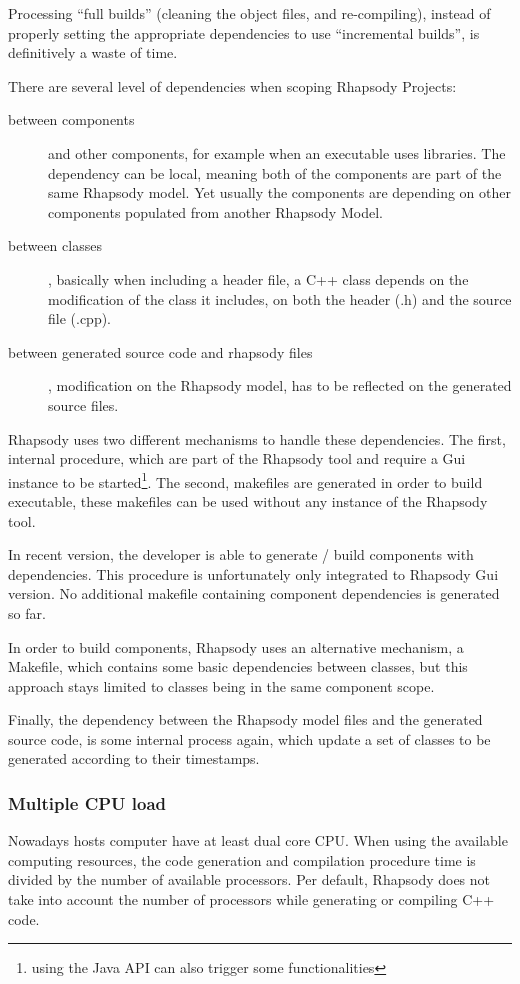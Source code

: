 \documentclass[dvips]{imsart}
\begin{document}
Processing ``full builds'' (cleaning the object files, and re-compiling), instead of properly
setting the appropriate dependencies to use ``incremental builds'', is
definitively a waste of time.

There are several level of dependencies when scoping Rhapsody Projects:
\begin{description}
  \item[between components] and other components, for example when an executable
  uses libraries. The dependency can be local, meaning both of the components
  are part of the same Rhapsody model. Yet usually the components are depending
  on other components populated from another Rhapsody Model.
  \item[between classes], basically when including a header file, a C++ class
  depends on the modification of the class it includes, on both the header (.h)
  and the source file (.cpp).
  \item[between generated source code and rhapsody files], modification on the
  Rhapsody model, has to be reflected on the generated source files.
\end{description}

Rhapsody uses two different mechanisms to handle these dependencies. The first,
internal procedure, which are part of the Rhapsody tool and require a Gui
instance to be started\footnote{using the Java API can also trigger some
functionalities}. The second, makefiles are generated in order to build
executable, these makefiles can be used without any instance of the
Rhapsody tool.

In recent version, the developer is able to generate / build
components with dependencies. This procedure is unfortunately only integrated
to Rhapsody Gui version. No additional makefile containing
component dependencies is generated so far.

In order to build components, Rhapsody uses an alternative mechanism, a
Makefile, which contains some basic dependencies between classes, but this
approach stays limited to classes being in the same component scope.

Finally, the dependency between the Rhapsody model files and the generated
source code, is some internal process again, which update a set of classes to
be generated according to their timestamps.

\subsubsection{Multiple CPU load}
Nowadays hosts computer have at least dual core CPU. When using the
available computing resources, the code generation and compilation procedure
time is divided by the number of available processors. Per default, Rhapsody
does not take into account the number of processors while generating or
compiling C++ code.
\end{document}
